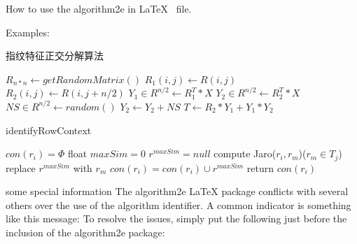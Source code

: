 \documentclass[UTF8]{ctexart}
\begin{document}
   
    How to use the algorithm2e in \LaTeX ~ file.
        
    Examples: 

        \begin{algorithm}[H]
            \caption{指纹特征正交分解算法}
            
            $R_{n*n} \leftarrow getRandomMatrix() $\;
				 {
					{
						$R_1(i, j) \leftarrow R(i,j)$ \;
						$R_2(i, j) \leftarrow R(i, j+n/2)$\;
					}
				}
				$Y_1 \in R^{n/2} \leftarrow R_1^T * X $ \;
				$Y_2 \in R^{n/2} \leftarrow R_2^T * X $ \;
				$NS \in R^{n/2} \leftarrow random()$ \;
				$Y_2 \leftarrow Y_2 + NS $ \;
				$T \leftarrow R_2 * Y_1 + Y_1 * Y_2 $ \;
            
    \end{algorithm}
    
    \begin{algorithm} 
     \caption{identifyRowContext} 
        $con(r_i)= \Phi$\; 
        { 
            float $maxSim=0$\; 
            $r^{maxSim}=null$\; 
            { 
                compute Jaro($r_i,r_m$)($r_m\in T_j$)\; 
                { 
                    replace $r^{maxSim}$ with $r_m$\; 
                } 
            } 
            $con(r_i)=con(r_i)\cup {r^{maxSim}}$\; 
        } 
        return $con(r_i)$\; 
    \end{algorithm}

 some special information
    The algorithm2e LaTeX package conflicts with several others over the use of the algorithm identifier.  A common indicator is something like this message: 
To resolve the issues, simply put the following just before the inclusion of the algorithm2e package:

\end{document}
